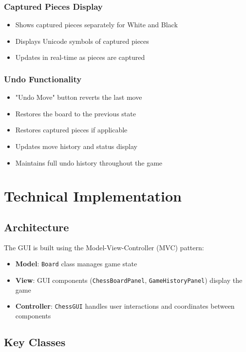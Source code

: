 \documentclass[12pt]{article}
\begin{document}
\subsubsection{Captured Pieces Display}
\begin{itemize}
    \item Shows captured pieces separately for White and Black
    \item Displays Unicode symbols of captured pieces
    \item Updates in real-time as pieces are captured
\end{itemize}

\subsubsection{Undo Functionality}
\begin{itemize}
    \item "Undo Move" button reverts the last move
    \item Restores the board to the previous state
    \item Restores captured pieces if applicable
    \item Updates move history and status display
    \item Maintains full undo history throughout the game
\end{itemize}

\section{Technical Implementation}

\subsection{Architecture}

The GUI is built using the Model-View-Controller (MVC) pattern:
\begin{itemize}
    \item \textbf{Model}: \texttt{Board} class manages game state
    \item \textbf{View}: GUI components (\texttt{ChessBoardPanel}, \texttt{GameHistoryPanel}) display the game
    \item \textbf{Controller}: \texttt{ChessGUI} handles user interactions and coordinates between components
\end{itemize}

\subsection{Key Classes}
\end{document}
